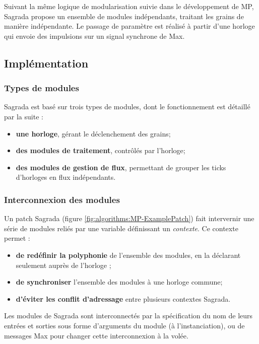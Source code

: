 \indent Suivant la même logique de modularisation suivie dans le développement de MP, Sagrada propose un ensemble de modules indépendants, traitant les grains de manière indépendante. Le passage de paramètre est réalisé à partir d'une horloge qui envoie des impulsions sur un signal synchrone de Max.

\subsection{Implémentation}

\subsubsection{Types de modules}
\noindent Sagrada est basé sur trois types de modules, dont le fonctionnement est détaillé par la suite :
\vspace{-1em}
\begin{itemize}[noitemsep]
	\item \textbf{une horloge}, gérant le déclenchement des grains;
	\item \textbf{des modules de traitement}, contrôlés par l'horloge;
	\item \textbf{des modules de gestion de flux}, permettant de grouper les ticks d'horloges en flux indépendants.
\end{itemize}


\subsubsection{Interconnexion des modules}

\noindent Un patch Sagrada (figure \ref{fig:algorithms:MP-ExamplePatch}) fait intervernir une série de modules reliés par une variable définissant un \textit{contexte}. Ce contexte permet :
\vspace{-1em}
\begin{itemize}[noitemsep]
	\item \textbf{de redéfinir la polyphonie} de l'ensemble des modules, en la déclarant seulement auprès de l'horloge ;
	\item \textbf{de synchroniser} l'ensemble des modules à une horloge commune;
	\item \textbf{d'éviter les conflit d'adressage} entre plusieurs contextes Sagrada.
\end{itemize}

\noindent Les modules de Sagrada sont interconnectés par la spécification du nom de leurs entrées et sorties sous forme d'arguments du module (à l'instanciation), ou de messages Max pour changer cette interconnexion à la volée.

